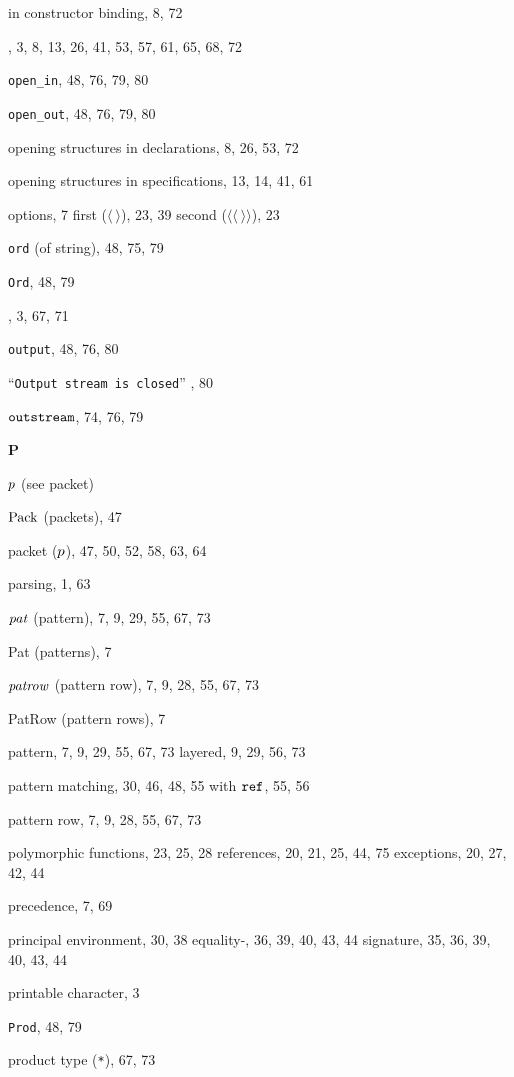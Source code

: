 \begin{theindex}
\subitem in constructor binding, 8, 72
\item \OPEN, 3, 8, 13, 26, 41, 53, 57, 61, 65, 68, 72
\item \verb+open_in+, 48, 76, 79, 80
\item \verb+open_out+, 48, 76, 79, 80
\item opening structures in declarations, 8, 26, 53, 72
\item opening structures in specifications, 13, 14, 41, 61
\item options, 7
\subitem first ($\langle\ \rangle$), 23, 39
\subitem second ($\langle\langle\ \rangle\rangle$), 23
\item {\tt ord} (of string), 48, 75, 79
\item {\tt Ord}, 48, 79
\item \ORELSE, 3, 67, 71
\item {\tt output}, 48, 76, 80
\item ``{\tt Output stream is closed}'' , 80
\item $\mbox{\tt outstream}$, 74, 76, 79
\indexspace
\parbox{65mm}{\hfil{\large\bf P}\hfil}
\indexspace
\item $p$ (see packet) 
\item ${\rm Pack}$ (packets), 47
\item packet ($p$), 47, 50, 52, 58, 63, 64
\item parsing, 1, 63
\item ${\it pat}$ (pattern), 7, 9, 29, 55, 67, 73
\item Pat (patterns), 7
\item ${\it patrow}$ (pattern row), 7, 9, 28, 55, 67, 73
\item PatRow (pattern rows), 7
\item pattern, 7, 9, 29, 55, 67, 73
\subitem layered, 9, 29, 56, 73
\item pattern matching, 30, 46, 48, 55
\subitem with $\mbox{\tt ref}$, 55, 56
\item pattern row, 7, 9, 28, 55, 67, 73
\item polymorphic 
\subitem functions, 23, 25, 28
\subitem references, 20, 21, 25, 44, 75
\subitem exceptions, 20, 27, 42, 44
\item precedence, 7, 69
\item principal 
\subitem environment, 30, 38
\subitem equality-, 36, 39, 40, 43, 44
\subitem signature, 35, 36, 39, 40, 43, 44
\item printable character, 3
\item {\tt Prod}, 48, 79
\item product type (\verb+*+), 67, 73

\end{theindex}
